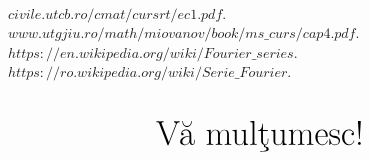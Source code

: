 \documentclass{beamer}
\begin{document}
\begin{frame}
\begin{thebibliography}\\
\bibitem{}$civile.utcb.ro/cmat/cursrt/ec1.pdf$.
\bibitem{}$www.utgjiu.ro/math/miovanov/book/ms\_curs/cap4.pdf$.
\bibitem{}$https://en.wikipedia.org/wiki/Fourier\_series$.
\bibitem{}$https://ro.wikipedia.org/wiki/Serie\_Fourier$.
\end{thebibliography}
\end{frame}

\section*{}
\begin{frame}
\begin{equation*}
\text{\Huge{V\u a mul\c tumesc!}}
\end{equation*}
\end{frame}
\end{document}
